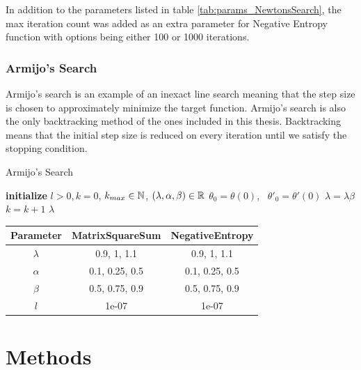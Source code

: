 \documentclass[a4paper,english,titlepage,12pt]{article}
\newcommand{\R}{\ensuremath\mathbb{R}}
\newcommand{\N}{\ensuremath\mathbb{N}}
\begin{document}
In addition to the parameters listed in table \ref{tab:params_NewtonsSearch}, the max iteration count was added as an extra parameter for Negative Entropy function with options being either 100 or 1000 iterations.


\subsubsection{Armijo's Search}

Armijo's search is an example of an inexact line search meaning that the step size is chosen to approximately minimize the target function. Armijo's search is also the only backtracking method of the ones included in this thesis. Backtracking means that the initial step size is reduced on every iteration until we satisfy the stopping condition. \cite{book:convex_optimization}

\begin{algorithm}[H]
\caption{Armijo's Search}
\label{alg_armijo}
\begin{algorithmic}[1]
\STATE \textbf{initialize} $l > 0, k = 0$, $k_{max} \in \N$, $(\lambda, \alpha, \beta) \in \R$
\STATE $\theta_0 = \theta(0)$, \ $\theta'_0 = \theta'(0)$
    \STATE $\lambda = \lambda \beta$
    \STATE $k = k + 1$
\ENDWHILE
\RETURN $\lambda$
\end{algorithmic}
\end{algorithm}

\begin{table}[H]
\label{tab:params_ArmijoSearch}
\centering
{}
\begin{tabular}{|c|c|c|}
\hline
\rowcolor{gray!25}
Parameter & MatrixSquareSum & NegativeEntropy \\
\hline
$\lambda$ & 0.9, 1, 1.1 & 0.9, 1, 1.1 \\
$\alpha$ & 0.1, 0.25, 0.5 & 0.1, 0.25, 0.5 \\
$\beta$ & 0.5, 0.75, 0.9 & 0.5, 0.75, 0.9 \\
$l$ & 1e-07 & 1e-07 \\
\hline
\end{tabular}
\end{table}


\section{Methods}
\end{document}
